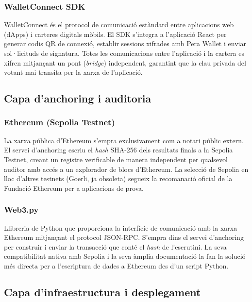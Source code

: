 \subsubsection{WalletConnect SDK}
 
WalletConnect és el protocol de comunicació estàndard entre aplicacions web (dApps) i carteres digitals mòbils. El SDK s'integra a l'aplicació React per generar codis QR de connexió, establir sessions xifrades amb Pera Wallet i enviar sol·licituds de signatura. Totes les comunicacions entre l'aplicació i la cartera es xifren mitjançant un pont (\textit{bridge}) independent, garantint que la clau privada del votant mai transita per la xarxa de l'aplicació.
 
\subsection{Capa d'anchoring i auditoria}
 
\subsubsection{Ethereum (Sepolia Testnet)}
 
La xarxa pública d'Ethereum s'empra exclusivament com a notari públic extern. El servei d'anchoring escriu el \textit{hash} SHA-256 dels resultats finals a la Sepolia Testnet, creant un registre verificable de manera independent per qualsevol auditor amb accés a un explorador de blocs d'Ethereum. La selecció de Sepolia en lloc d'altres testnets (Goerli, ja obsoleta) segueix la recomanació oficial de la Fundació Ethereum per a aplicacions de prova.
 
\subsubsection{Web3.py}
 
Llibreria de Python que proporciona la interfície de comunicació amb la xarxa Ethereum mitjançant el protocol JSON-RPC. S'empra dins el servei d'anchoring per construir i enviar la transacció que conté el \textit{hash} de l'escrutini. La seva compatibilitat nativa amb Sepolia i la seva àmplia documentació la fan la solució més directa per a l'escriptura de dades a Ethereum des d'un script Python.
 
\subsection{Capa d'infraestructura i desplegament}
 
